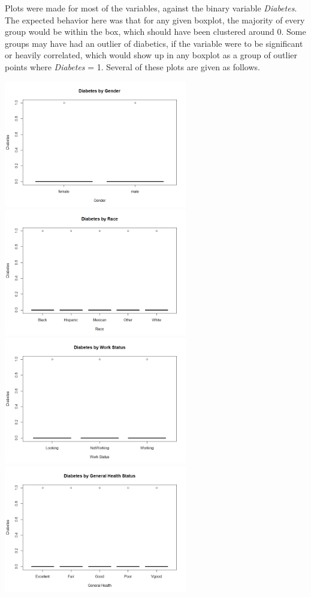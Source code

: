 \documentclass[letter,12pt]{article}
\begin{document}
	Plots were made for most of the variables, against the binary variable \textit{Diabetes}. The expected behavior here was that for any given boxplot, the majority of every group would be within the box, which should have been clustered around 0. Some groups may have had an outlier of diabetics, if the variable were to be significant or heavily correlated, which would show up in any boxplot as a group of outlier points where \textit{Diabetes} = 1. Several of these plots are given as follows.
	\begin{center}
	  \includegraphics[width=0.6\textwidth]{img/boxdiabetesgender.png}
	  \includegraphics[width=0.6\textwidth]{img/boxdiabetesrace.png}
	  \includegraphics[width=0.6\textwidth]{img/boxdiabeteswork.png}
	  \includegraphics[width=0.6\textwidth]{img/boxdiabeteshealthgen.png}
	\end{center}
\end{document}
